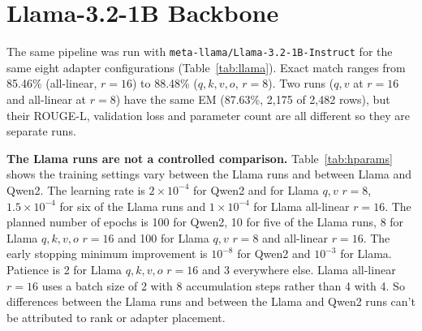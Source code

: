 \documentclass[12pt]{report}
\begin{document}


\section{Llama-3.2-1B Backbone}
\label{sec:llama}
The same pipeline was run with \texttt{meta-llama/Llama-3.2-1B-Instruct} \cite{llama32} for the same eight adapter configurations (Table~\ref{tab:llama}). Exact match ranges from 85.46\% (all-linear, $r=16$) to 88.48\% ($q,k,v,o$, $r=8$). Two runs ($q,v$ at $r=16$ and all-linear at $r=8$) have the same EM (87.63\%, 2,175 of 2,482 rows), but their ROUGE-L, validation loss and parameter count are all different so they are separate runs.

\textbf{The Llama runs are not a controlled comparison.} Table~\ref{tab:hparams} shows the training settings vary between the Llama runs and between Llama and Qwen2. The learning rate is $2\times10^{-4}$ for Qwen2 and for Llama $q,v$ $r=8$, $1.5\times10^{-4}$ for six of the Llama runs and $1\times10^{-4}$ for Llama all-linear $r=16$. The planned number of epochs is 100 for Qwen2, 10 for five of the Llama runs, 8 for Llama $q,k,v,o$ $r=16$ and 100 for Llama $q,v$ $r=8$ and all-linear $r=16$. The early stopping minimum improvement is $10^{-8}$ for Qwen2 and $10^{-3}$ for Llama. Patience is 2 for Llama $q,k,v,o$ $r=16$ and 3 everywhere else. Llama all-linear $r=16$ uses a batch size of 2 with 8 accumulation steps rather than 4 with 4. So differences between the Llama runs and between the Llama and Qwen2 runs can't be attributed to rank or adapter placement.
\end{document}
